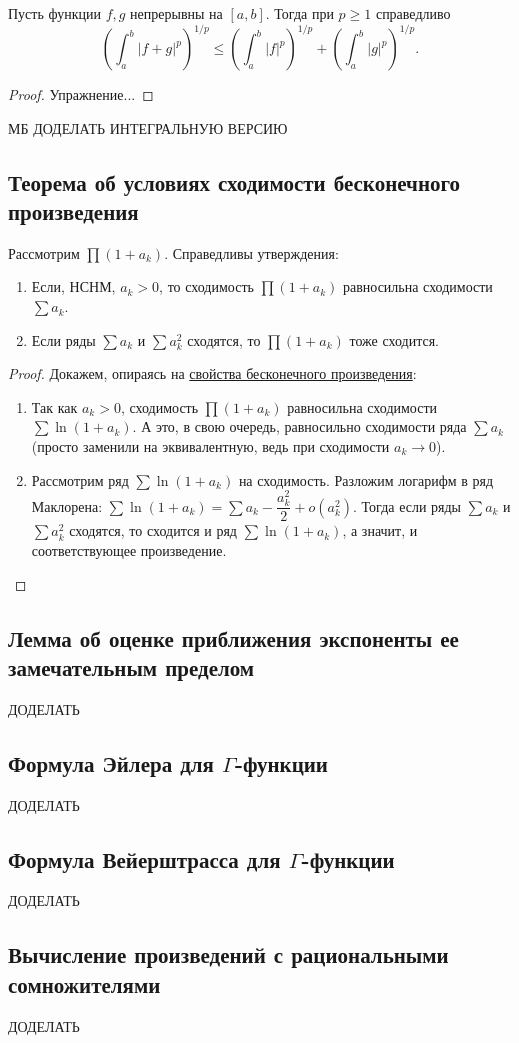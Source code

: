 \begin{ntheorem}
	Пусть функции \(f, g\) непрерывны на \([a, b]\). Тогда при \(p \geqslant 1\) справедливо \[
		\left(\int_a^b |f + g|^p \right)^{1/p} \leqslant \left(\int_a^b |f|^p \right)^{1/p} + \left(\int_a^b |g|^p \right)^{1/p}.
	\]
\end{ntheorem}
\begin{proof}
	Упражнение...
\end{proof}

МБ ДОДЕЛАТЬ ИНТЕГРАЛЬНУЮ ВЕРСИЮ

\subsection{Теорема об условиях сходимости бесконечного произведения}

\begin{theorem}
	Рассмотрим \(\prod (1 + a_k)\). Справедливы утверждения:
	\begin{enumerate}
		\item Если, НСНМ, \(a_k > 0\), то сходимость \(\prod (1 + a_k)\) равносильна сходимости \(\sum a_k\).
		\item Если ряды \(\sum a_k\) и \(\sum a_k^2\) сходятся, то \(\prod (1 + a_k)\) тоже сходится.
	\end{enumerate}
\end{theorem}
\begin{proof}
	Докажем, опираясь на \hyperlink{besk}{свойства бесконечного произведения}:
	\begin{enumerate}
		\item Так как \(a_k > 0\), сходимость \(\prod (1 + a_k)\) равносильна сходимости \(\sum \ln (1 + a_k)\). А это, в свою очередь, равносильно сходимости ряда \(\sum a_k\) (просто заменили на эквивалентную, ведь при сходимости \(a_k \to 0\)).
		\item Рассмотрим ряд \(\sum \ln (1 + a_k)\) на сходимость. Разложим логарифм в ряд Маклорена: \(\sum \ln (1 + a_k) = \sum a_k - \dfrac{a_k^2}{2} + o(a_k^2)\). Тогда если ряды \(\sum a_k\) и \(\sum a_k^2\) сходятся, то сходится и ряд \(\sum \ln (1 + a_k)\), а значит, и соответствующее произведение.
	\end{enumerate}
\end{proof}

\subsection{Лемма об оценке приближения экспоненты ее замечательным пределом}

ДОДЕЛАТЬ

\subsection{Формула Эйлера для \(\Gamma\)-функции}

ДОДЕЛАТЬ

\subsection{Формула Вейерштрасса для \(\Gamma\)-функции}

ДОДЕЛАТЬ

\subsection{Вычисление произведений с рациональными сомножителями}

ДОДЕЛАТЬ
